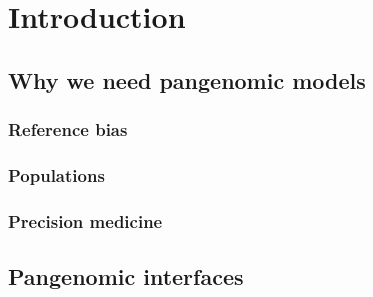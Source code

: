\section{Introduction}


\subsection{Why we need pangenomic models}


\subsubsection{Reference bias}

\subsubsection{Populations}

\subsubsection{Precision medicine}

\subsection{Pangenomic interfaces}


